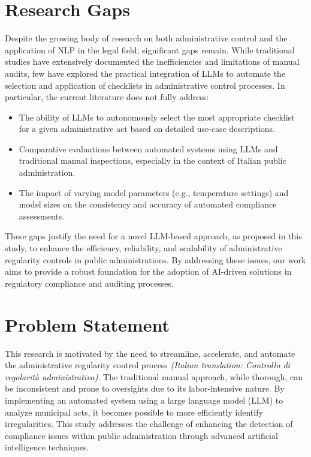 \documentclass[../main.tex]{subfiles}
\begin{document}
\section{Research Gaps}
Despite the growing body of research on both administrative control and the application of NLP in the legal field, significant gaps remain. While traditional studies have extensively documented the inefficiencies and limitations of manual audits, few have explored the practical integration of LLMs to automate the selection and application of checklists in administrative control processes. In particular, the current literature does not fully address:
\begin{itemize}
    \item The ability of LLMs to autonomously select the most appropriate checklist for a given administrative act based on detailed use-case descriptions.
    \item Comparative evaluations between automated systems using LLMs and traditional manual inspections, especially in the context of Italian public administration.
    \item The impact of varying model parameters (e.g., temperature settings) and model sizes on the consistency and accuracy of automated compliance assessments.
\end{itemize}
These gaps justify the need for a novel LLM-based approach, as proposed in this study, to enhance the efficiency, reliability, and scalability of administrative regularity controls in public administrations. By addressing these issues, our work aims to provide a robust foundation for the adoption of AI-driven solutions in regulatory compliance and auditing processes.


\section{Problem Statement}
This research is motivated by the need to streamline, accelerate, and automate the administrative regularity control process \textit{(Italian translation: Controllo di regolarità administrativa)}. The traditional manual approach, while thorough, can be inconsistent and prone to oversights due to its labor-intensive nature. By implementing an automated system using a large language model (LLM) to analyze municipal acts, it becomes possible to more efficiently identify irregularities. This study addresses the challenge of enhancing the detection of compliance issues within public administration through advanced artificial intelligence techniques.
\end{document}
